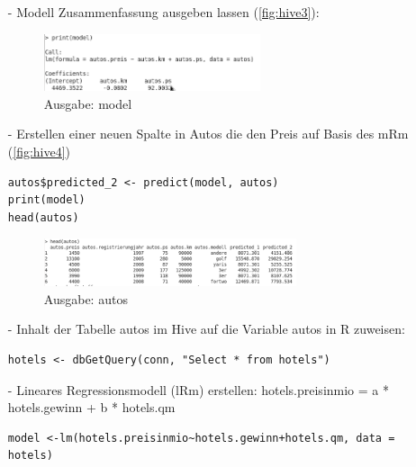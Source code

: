 \begin{itemize}
\item[-] Modell Zusammenfassung ausgeben lassen (\autoref{fig:hive3}):
\begin{figure}[!htb]
        \begin{minipage}{1\textwidth}
                \centering
                \includegraphics[width=0.60\textwidth]{pics/autos_model_2.png}\par\vspace{0cm}
                \caption{Ausgabe: model}
                \label{fig:hive3}
        \end{minipage}
\end{figure}


\item[-] Erstellen einer neuen Spalte in Autos die den Preis auf Basis des mRm (\autoref{fig:hive4})
\begin{lstlisting}
autos$predicted_2 <- predict(model, autos)
print(model)
head(autos)
\end{lstlisting}
\begin{figure}[!htb]
        \begin{minipage}{1\textwidth}
                \centering
                \includegraphics[width=0.70\textwidth]{pics/autos_head.png}\par\vspace{0cm}
                \caption{Ausgabe: autos}
                \label{fig:hive4}
        \end{minipage}
\end{figure}
\item[-] Inhalt der Tabelle autos im Hive auf die Variable autos in R zuweisen:
\begin{lstlisting}
hotels <- dbGetQuery(conn, "Select * from hotels")
\end{lstlisting}

\item[-] Lineares Regressionsmodell (lRm) erstellen: hotels.preisinmio = a * hotels.gewinn + b * hotels.qm
\begin{lstlisting}
model <-lm(hotels.preisinmio~hotels.gewinn+hotels.qm, data = hotels)
\end{lstlisting}


\end{itemize}
